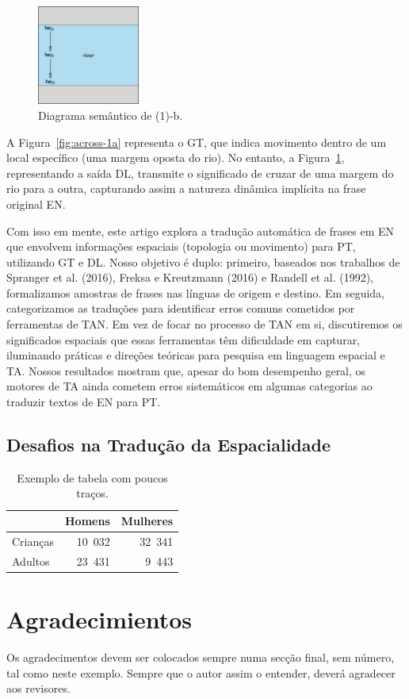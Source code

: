 \documentclass[a4paper, twocolumn, 11pt, twoside]{article}
\begin{document}
\begin{figure}[ht]
  \centering
  \includegraphics[width=0.3\textwidth]{bb-b-2.jpg}
  \caption{Diagrama semântico de (1)-b.}\label{fig:across-1b}
\end{figure}


A Figura~\ref{fig:across-1a} representa o GT, que indica movimento dentro de um local específico (uma margem oposta do rio). No entanto, a Figura~\ref{fig:across-1b}, representando a saída DL, transmite o significado de cruzar de uma margem do rio para a outra, capturando assim a natureza dinâmica implícita na frase original EN. 

Com isso em mente, este artigo explora a tradução automática de frases em EN que envolvem informações espaciais (topologia ou movimento) para PT, utilizando GT e DL. Nosso objetivo é duplo: primeiro, baseados nos trabalhos de Spranger et al. (2016), Freksa e Kreutzmann (2016) e Randell et al. (1992), formalizamos amostras de frases nas línguas de origem e destino. Em seguida, categorizamos as traduções para identificar erros comuns cometidos por ferramentas de TAN. Em vez de focar no processo de TAN em si, discutiremos os significados espaciais que essas ferramentas têm dificuldade em capturar, iluminando práticas e direções teóricas para pesquisa em linguagem espacial e TA. Nossos resultados mostram que, apesar do bom desempenho geral, os motores de TA ainda cometem erros sistemáticos em algumas categorias ao traduzir textos de EN para PT.


\subsection{Desafios na Tradução da Espacialidade}


\begin{table}[htb]
  \centering
  \begin{tabular}{lrr}
    \toprule
    & \textbf{Homens} & \textbf{Mulheres} \\
    \midrule
    Crianças & 10~032 & 32~341 \\
    Adultos & 23~431 & 9~443 \\
    \bottomrule
  \end{tabular}
  \caption{Exemplo de tabela com poucos traços.}
  \label{tab:1}
\end{table}



\section*{Agradecimientos}

Os agradecimentos devem ser colocados sempre numa secção final, sem número, tal como
neste exemplo. Sempre que o autor assim o entender, deverá agradecer aos revisores.



\end{document}
